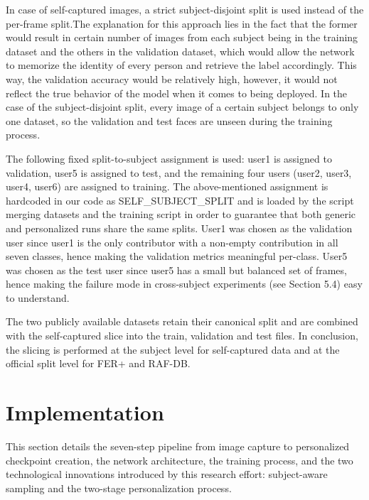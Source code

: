 \documentclass[12pt,a4paper]{article}
\begin{document}
In case of self-captured images, a strict subject-disjoint split is used instead of the per-frame split.The explanation for this approach lies in the fact that the former would result in certain number of images from each subject being in the training dataset and the others in the validation dataset, which would allow the network to memorize the identity of every person and retrieve the label accordingly. This way, the validation accuracy would be relatively high, however, it would not reflect the true behavior of the model when it comes to being deployed. In the case of the subject-disjoint split, every image of a certain subject belongs to only one dataset, so the validation and test faces are unseen during the training process.

The following fixed split-to-subject assignment is used: user1 is assigned to validation, user5
is assigned to test, and the remaining four users (user2, user3, user4, user6) are assigned
to training. The above-mentioned assignment is hardcoded in our code as SELF_SUBJECT_SPLIT and is loaded by the script merging datasets and the training script in order to guarantee that both generic and personalized runs share the same splits. User1 was chosen as the validation user since user1 is the only contributor with a non-empty contribution in all seven classes, hence making the validation metrics meaningful per-class. User5 was chosen as the test user since user5 has a small but balanced set of frames, hence making the failure mode in cross-subject experiments (see Section 5.4) easy to understand.

The two publicly available datasets retain their canonical split and are combined with the self-captured slice into the train, validation and test files. In conclusion, the slicing is performed at the subject level for self-captured data and at the official split level for FER+ and RAF-DB.

\section{Implementation}
\label{sec:impl}

This section details the seven-step pipeline from image capture to personalized checkpoint creation, the network architecture, the training process, and the two technological innovations introduced by this research effort: subject-aware sampling and the two-stage personalization process.
\end{document}
